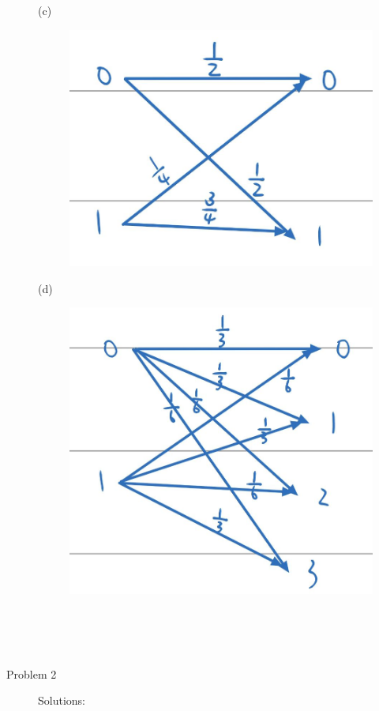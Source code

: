 \documentclass[11pt]{article}
\begin{document}
\begin{description}
\begin{figure}[htbp]
            \label{fig:figure2}
            \end{figure}
        \subitem(c)
            \begin{figure}[htbp]
            \centering
            \includegraphics[scale=0.2]{3}
            \label{fig:figure3}
            \end{figure}
        \subitem(d)
            \begin{figure}[htbp]
            \centering
            \includegraphics[scale=0.2]{4}
            \label{fig:figure4}
            \end{figure}
\\
\\
\\
    \item[Problem 2] Solutions:

\end{description}
\end{document}
